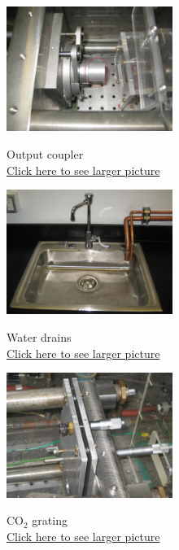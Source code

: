 \documentclass{../lab}
\begin{document}
\begin{figure}[H]
\captionsetup{justification=centering}
\centering
  \href{http://experimentationlab.berkeley.edu/sites/default/files/images/outputcoupler.jpg}{\includegraphics[height=115pt,keepaspectratio]{images/outputcoupler.jpg}}
  \caption{Output coupler\\ \href{http://experimentationlab.berkeley.edu/sites/default/files/images/outputcoupler.jpg}{Click here to see larger picture}}
  \label{fig:OutputCoupler}
\endminipage\hfill
{}
\centering
  \href{http://experimentationlab.berkeley.edu/sites/default/files/images/Water_Drains_3531.jpg}{\includegraphics[height=115pt,keepaspectratio]{images/Water_Drains_3531.jpg}}
  \caption{Water drains \\
  \href{http://experimentationlab.berkeley.edu/sites/default/files/images/Water_Drains_3531.jpg}{Click here to see larger picture}}
  \label{fig:WaterDrains}
\endminipage\hfill
{}
\centering
  \href{http://experimentationlab.berkeley.edu/sites/default/files/CO-2/Co-2-Grating_3641_0.JPG}{\includegraphics[height=115pt,keepaspectratio]{images/Co-2-Grating_3641_0.JPG}}
  \caption{CO$_2$ grating \\ \href{http://experimentationlab.berkeley.edu/sites/default/files/CO-2/Co-2-Grating_3641_0.JPG}{Click here to see larger picture}}\label{fig:Grating}
\endminipage
\end{figure}
\end{document}
